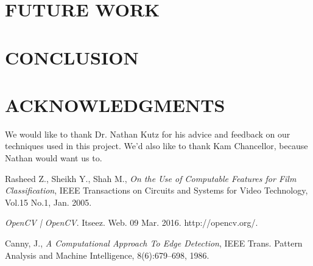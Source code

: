 \documentclass[letterpaper, 10 pt, conference]{ieeeconf}  %
\begin{document}
\section{FUTURE WORK}



\section{CONCLUSION}



\section{ACKNOWLEDGMENTS}

We would like to thank Dr. Nathan Kutz for his advice and feedback on our techniques used in this project. We'd also like to thank Kam Chancellor, because Nathan would want us to.


\begin{thebibliography}{99}
Rasheed Z., Sheikh Y., Shah M., {\it On the Use of Computable Features for Film Classification}, IEEE Transactions on Circuits and Systems for Video Technology, Vol.15 No.1, Jan. 2005.

{\it OpenCV | OpenCV}. Itseez. Web. 09 Mar. 2016. http://opencv.org/.

Canny, J., {\it A Computational Approach To Edge Detection}, IEEE Trans. Pattern Analysis and Machine Intelligence, 8(6):679–698, 1986.

\end{thebibliography}
\end{document}
